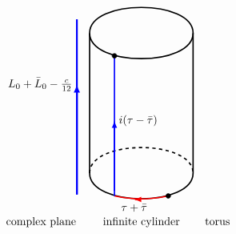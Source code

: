 \documentclass[12pt, a4paper]{article}
\theoremstyle{break}
\begin{document}
\begin{tcolorbox}
\begin{align*}
\begin{array}{ccc}
\begin{tikzpicture}[xscale = .65, yscale = .55, baseline=(current  bounding  box.center)]
  \draw [blue, ultra thick] (4.3, -5.8) -- (4.3, 4.2);
  \draw [blue, ultra thick, -latex] (4.3, -5.8) -- (4.3, .5) node[black, left] {$L_0+\bar{L}_0-\frac{c}{12}$};
 \end{tikzpicture}
 & 
 \begin{tikzpicture}[xscale = .65, yscale = .55, baseline=(current  bounding  box.center)]
  \draw [very thick] (0, -4) -- (0, 4);
  \draw [very thick] (5, -4) -- (5, 4);
  \draw [very thick] (0, -4) to [out = -90, in = -90] (5, -4);
  \draw [very thick, dashed] (0, -4) to [out = 90, in = 90] (5, -4);
  \draw [very thick] (0, 4) to [out = -90, in = -90] (5, 4);
  \draw [very thick] (0, 4) to [out = 90, in = 90] (5, 4);
  \draw [red, very thick] (1.2, -5.3) to [out = -13, in = -167] (3.8, -5.3);
  \draw [red, very thick, -latex] (2.2, -5.5) -- (2.15, -5.5) node[black, below] {$\tau+\bar{\tau}$};
  \draw [blue, very thick] (1.2, -5.3) -- (1.2, 2.7);
  \draw [blue, very thick, -latex] (1.2, -5) -- (1.2, -1) node[black, right] {$i(\tau-\bar\tau)$};
  \node[draw, circle, inner sep=1.5pt, fill] at (3.8, -5.3) {};
  \node[draw, circle, inner sep=1.5pt, fill] at (1.2, 2.7) {};
 \end{tikzpicture}
 \\
 \text{complex plane}
 & 
 \text{infinite cylinder}
 &
 \text{torus}
 \end{array}
\end{align*}
\end{tcolorbox}
\end{document}
